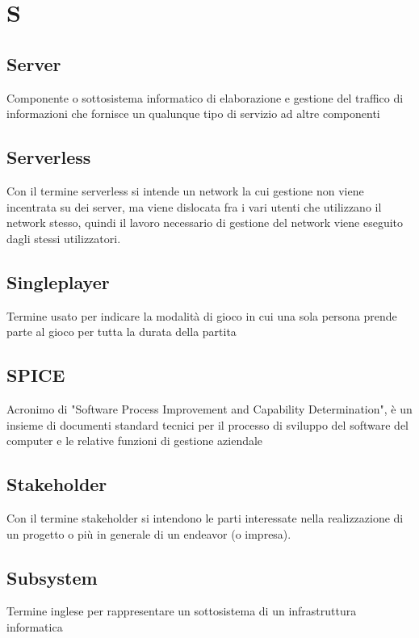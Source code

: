 \section{S}
	\subsection{Server}
		Componente o sottosistema informatico di elaborazione e gestione del traffico di informazioni che fornisce un qualunque tipo di servizio ad altre componenti
	\subsection{Serverless} 
		Con il termine serverless si intende un network la cui gestione non viene incentrata su dei server, ma viene dislocata fra i vari utenti che utilizzano il network stesso, quindi il lavoro necessario di gestione del network viene eseguito dagli stessi utilizzatori.
	\subsection{Singleplayer}
		Termine usato per indicare la modalità di gioco in cui una sola persona prende parte al gioco per tutta la durata della partita
	\subsection{SPICE}
		Acronimo di "Software Process Improvement and Capability Determination", è un insieme di documenti standard tecnici per il processo di sviluppo del software del computer e le relative funzioni di gestione aziendale
	\subsection{Stakeholder}  
		Con il termine stakeholder si intendono le parti interessate nella realizzazione di un progetto o più in generale di un endeavor (o impresa).
	\subsection{Subsystem}
		Termine inglese per rappresentare un sottosistema di un infrastruttura informatica

\newpage
